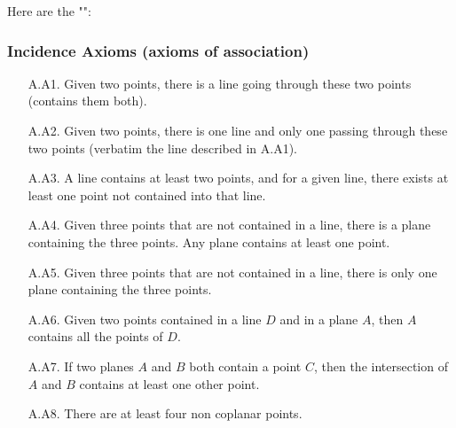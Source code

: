 	\pagebreak	
	Here are the "":

	\subsubsection{Incidence Axioms (axioms of association)}
		\begin{enumerate}
			\item[A.A1.] Given two points, there is a line going through these two points (contains them both).
	
			\item[A.A2.] Given two points, there is one line and only  one passing through these two points (verbatim the line described in A.A1).
	
			\item[A.A3.] A line contains at least two points, and for a given line, there exists at least one point not contained into that line.
	
			\item[A.A4.] Given three points that are not contained in a line, there is a plane containing the three points. Any plane contains at least one point.
	
			\item[A.A5.] Given three points that are not contained in a line, there is only one plane containing the three points.
	
			\item[A.A6.] Given two points contained in a line $D$ and in a plane $A$, then $A$ contains all the points of $D$.
	
			\item[A.A7.] If two planes $A$ and $B$ both contain a point $C$, then the intersection of $A$ and $B$ contains at least one other point.
	
			\item[A.A8.] There are at least four non coplanar points.
		\end{enumerate}
		
